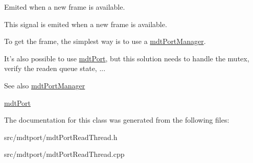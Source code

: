 Emited when a new frame is available. 

This signal is emited when a new frame is available.\par
 To get the frame, the simplest way is to use a \hyperlink{classmdt_port_manager}{mdtPortManager}.\par
 It's also possible to use \hyperlink{classmdt_port}{mdtPort}, but this solution needs to handle the mutex, verify the readen queue state, ... \begin{DoxySeeAlso}{See also}
\hyperlink{classmdt_port_manager}{mdtPortManager} 

\hyperlink{classmdt_port}{mdtPort} 
\end{DoxySeeAlso}


The documentation for this class was generated from the following files:\begin{DoxyCompactItemize}
\item 
src/mdtport/mdtPortReadThread.h\item 
src/mdtport/mdtPortReadThread.cpp\end{DoxyCompactItemize}
